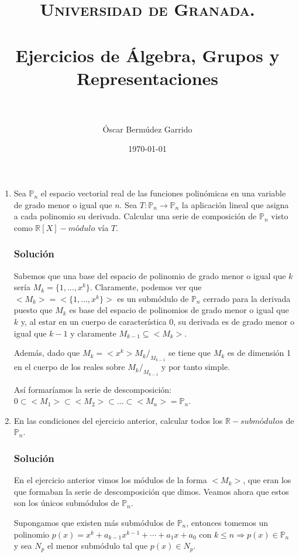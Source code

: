 \documentclass[paper=a4, fontsize=11pt, spanish]{scrartcl}
\title{
  \normalfont \normalsize 
  \textsc{Universidad de Granada.} \\ [25pt] %
  \horrule{0.5pt} \\[0.4cm] %
  \huge Ejercicios de Álgebra, Grupos y Representaciones \\ %
  \horrule{2pt} \\[0.5cm] %
}
\author{Óscar Bermúdez Garrido} %
\date{\normalsize\today} %
\begin{document}
	\maketitle %
	
	\newpage

	\begin{enumerate}
		\item Sea $\mathbb{P}_n$ el espacio vectorial real de las funciones polinómicas en una variable de grado
		menor o igual que $n$. Sea $T: \mathbb{P}_n \rightarrow \mathbb{P}_n$ la aplicación lineal que asigna a
		cada polinomio su derivada. Calcular una serie de composición de $\mathbb{P}_n$ visto como $\mathbb{R}[X]
		-módulo$ vía $T$.
		\subsubsection*{Solución}
		Sabemos que una base del espacio de polinomio de grado menor o igual que $k$ sería $M_k = \{1, \dots, x^k\}$.
		Claramente, podemos ver que $<M_k> = <\{1, \dots, x^k\}>$ es un submódulo de $\mathbb{P}_n$ cerrado para
		la derivada puesto que $M_k$ es base del espacio de polinomios de grado menor o igual que $k$ y, al estar
		en un cuerpo de característica 0, su derivada es de grado menor o igual que $k-1$ y claramente $M_{k-1}
		\subseteq <M_k>$.
		
		Además, dado que $M_k = <x^k> M_k/_{M_{k-1}}$ se tiene que $M_k$ es de dimensión 1 en el cuerpo de los
		reales sobre $M_k/_{M_{k-1}}$ y por tanto simple.
		
		Así formaríamos la serie de descomposición: $0 \subset <M_1> \subset <M_2> \subset \dots \subset <M_n> =
		\mathbb{P}_n$.
		
		\item En las condiciones del ejercicio anterior, calcular todos los $\mathbb{R}-submódulos$ de $\mathbb{P}_n$.
		\subsubsection*{Solución}
		En el ejercicio anterior vimos los módulos de la forma $<M_k>$, que eran los que formaban la serie de
		descomposición que dimos. Veamos ahora que estos son los únicos submódulos de $\mathbb{P}_n$.
		
		Supongamos que existen más submódulos de $\mathbb{P}_n$, entonces tomemos un polinomio $p(x) = x^k +
		a_{k-1}x^{k-1} + \cdots + a_1x+a_0$ con $k \leq n \Rightarrow p(x) \in \mathbb{P}_n$ y sea $N_p$ el menor
		submódulo tal que $p(x) \in N_p$.
		

\end{enumerate}
\end{document}
